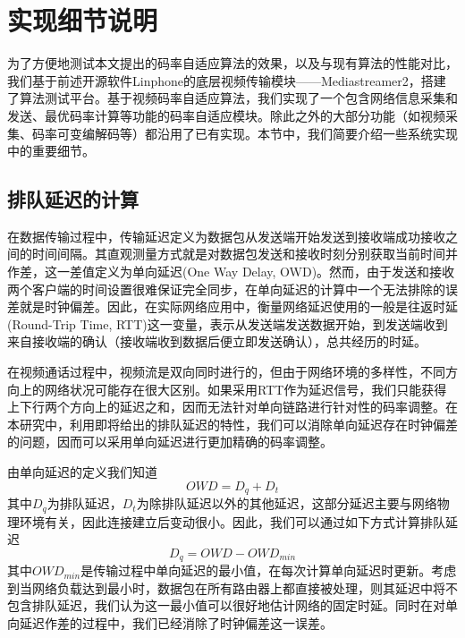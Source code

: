 \section{实现细节说明}
为了方便地测试本文提出的码率自适应算法的效果，以及与现有算法的性能对比，我们基于前述开源软件Linphone的底层视频传输模块——Mediastreamer2，搭建了算法测试平台。基于视频码率自适应算法，我们实现了一个包含网络信息采集和发送、最优码率计算等功能的码率自适应模块。除此之外的大部分功能（如视频采集、码率可变编解码等）都沿用了已有实现。本节中，我们简要介绍一些系统实现中的重要细节。

    \subsection{排队延迟的计算}\label{chap:qd_calc}
    在数据传输过程中，传输延迟定义为数据包从发送端开始发送到接收端成功接收之间的时间间隔。其直观测量方式就是对数据包发送和接收时刻分别获取当前时间并作差，这一差值定义为单向延迟(One Way Delay, OWD)。然而，由于发送和接收两个客户端的时间设置很难保证完全同步，在单向延迟的计算中一个无法排除的误差就是时钟偏差。因此，在实际网络应用中，衡量网络延迟使用的一般是往返时延(Round-Trip Time, RTT)这一变量，表示从发送端发送数据开始，到发送端收到来自接收端的确认（接收端收到数据后便立即发送确认），总共经历的时延。

    在视频通话过程中，视频流是双向同时进行的，但由于网络环境的多样性，不同方向上的网络状况可能存在很大区别。如果采用RTT作为延迟信号，我们只能获得上下行两个方向上的延迟之和，因而无法针对单向链路进行针对性的码率调整。在本研究中，利用即将给出的排队延迟的特性，我们可以消除单向延迟存在时钟偏差的问题，因而可以采用单向延迟进行更加精确的码率调整。

    由单向延迟的定义我们知道
    \begin{equation}\label{eq:owd}
        OWD = D_q + D_t
    \end{equation}
    其中$D_q$为排队延迟，$D_t$为除排队延迟以外的其他延迟，这部分延迟主要与网络物理环境有关，因此连接建立后变动很小。因此，我们可以通过如下方式计算排队延迟
    \begin{equation}\label{eq:qd}
        D_q = OWD - OWD_{min}
    \end{equation}
    其中$OWD_{min}$是传输过程中单向延迟的最小值，在每次计算单向延迟时更新。考虑到当网络负载达到最小时，数据包在所有路由器上都直接被处理，则其延迟中将不包含排队延迟，我们认为这一最小值可以很好地估计网络的固定时延。同时在对单向延迟作差的过程中，我们已经消除了时钟偏差这一误差。


